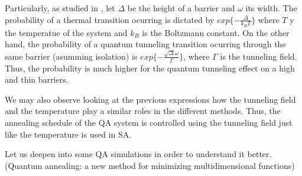 Particularly, as studied in \cite{Ray1989}, let $\Delta$ be the height of a barrier and $\omega$ its width. The probability of a thermal transition ocurring is dictated by $exp\{-\frac{\Delta}{k_B T}\}$ where $T$ y the temperatue of the system and $k_B$ is the Boltzmann constant. On the other hand, the probability of a quantum tunneling transition ocurring through the same barrier (asumming isolation) is $exp\{-\frac{\sqrt \Delta \omega}{\Gamma}\}$, where $\Gamma$ is the tunneling field. Thus, the probability is much higher for the quantum tunneling effect on a high and thin barriers.

We may also observe looking at the previous expressions how the tunneling field and the temperature play a similar roles in the different methods. Thus, the annealing schedule of the QA system is controlled using the tunneling field just like the temperature is used in SA.

Let us deepen into some QA simulations in order to understand it better. (Quantum annealing: a new method for minimizing multidimensional functions)







